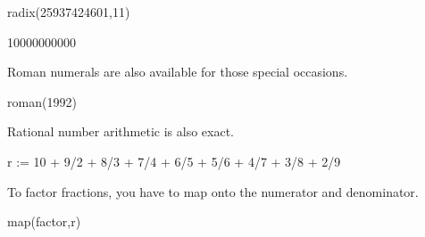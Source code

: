 {{{{{{{{\begin{xtc}
\begin{spadsrc}
radix(25937424601,11)
\end{spadsrc}
\begin{TeXOutput}
\begin{fricasmath}{4}
10000000000%
\end{fricasmath}
\end{TeXOutput}
\end{xtc}
\begin{xtc}
\begin{xtccomment}
Roman numerals are also available for those special occasions.
\end{xtccomment}
\begin{spadsrc}
roman(1992)
\end{spadsrc}
\begin{TeXOutput}
\begin{fricasmath}{5}
%
\end{fricasmath}
\end{TeXOutput}
\end{xtc}
\begin{xtc}
\begin{xtccomment}
Rational number arithmetic is also exact.
\end{xtccomment}
\begin{spadsrc}
r := 10 + 9/2 + 8/3 + 7/4 + 6/5 + 5/6 + 4/7 + 3/8 + 2/9
\end{spadsrc}
\begin{TeXOutput}
\begin{fricasmath}{6}
%
\end{fricasmath}
\end{TeXOutput}
\end{xtc}
\begin{xtc}
\begin{xtccomment}
To factor fractions, you have to
map  onto the numerator and denominator.
\end{xtccomment}
\begin{spadsrc}
map(factor,r) 
\end{spadsrc}
\begin{TeXOutput}
\begin{fricasmath}{7}
%
\end{fricasmath}
\end{TeXOutput}

\end{xtc}}}}}}}}}
